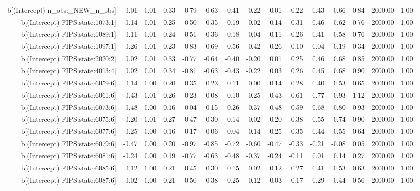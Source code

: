 \begin{table}[ht]
\begin{tabular}{rrrrrrrrrrrrrrr}
  b[(Intercept) n\_obs:\_NEW\_n\_obs] & 0.01 & 0.01 & 0.33 & -0.79 & -0.63 & -0.41 & -0.22 & 0.01 & 0.22 & 0.43 & 0.66 & 0.84 & 2000.00 & 1.00 \\ 
  b[(Intercept) FIPS:state:1073:1] & 0.14 & 0.01 & 0.25 & -0.50 & -0.35 & -0.19 & -0.02 & 0.14 & 0.31 & 0.46 & 0.62 & 0.76 & 2000.00 & 1.00 \\ 
  b[(Intercept) FIPS:state:1089:1] & 0.11 & 0.01 & 0.24 & -0.51 & -0.36 & -0.18 & -0.04 & 0.11 & 0.26 & 0.41 & 0.58 & 0.76 & 2000.00 & 1.00 \\ 
  b[(Intercept) FIPS:state:1097:1] & -0.26 & 0.01 & 0.23 & -0.83 & -0.69 & -0.56 & -0.42 & -0.26 & -0.10 & 0.04 & 0.19 & 0.34 & 2000.00 & 1.00 \\ 
  b[(Intercept) FIPS:state:2020:2] & 0.02 & 0.01 & 0.33 & -0.77 & -0.64 & -0.40 & -0.20 & 0.01 & 0.25 & 0.46 & 0.68 & 0.85 & 2000.00 & 1.00 \\ 
  b[(Intercept) FIPS:state:4013:4] & 0.02 & 0.01 & 0.34 & -0.81 & -0.63 & -0.43 & -0.22 & 0.03 & 0.26 & 0.45 & 0.68 & 0.90 & 2000.00 & 1.00 \\ 
  b[(Intercept) FIPS:state:6059:6] & 0.14 & 0.00 & 0.20 & -0.35 & -0.23 & -0.11 & 0.00 & 0.14 & 0.28 & 0.40 & 0.53 & 0.65 & 2000.00 & 1.00 \\ 
  b[(Intercept) FIPS:state:6061:6] & 0.43 & 0.01 & 0.26 & -0.23 & -0.08 & 0.10 & 0.25 & 0.43 & 0.61 & 0.77 & 0.93 & 1.12 & 2000.00 & 1.00 \\ 
  b[(Intercept) FIPS:state:6073:6] & 0.48 & 0.00 & 0.16 & 0.04 & 0.15 & 0.26 & 0.37 & 0.48 & 0.59 & 0.68 & 0.80 & 0.93 & 2000.00 & 1.00 \\ 
  b[(Intercept) FIPS:state:6075:6] & 0.20 & 0.01 & 0.27 & -0.47 & -0.30 & -0.14 & 0.02 & 0.20 & 0.38 & 0.55 & 0.74 & 0.90 & 2000.00 & 1.00 \\ 
  b[(Intercept) FIPS:state:6077:6] & 0.25 & 0.00 & 0.16 & -0.17 & -0.06 & 0.04 & 0.14 & 0.25 & 0.35 & 0.44 & 0.55 & 0.64 & 2000.00 & 1.00 \\ 
  b[(Intercept) FIPS:state:6079:6] & -0.47 & 0.00 & 0.20 & -0.97 & -0.85 & -0.72 & -0.60 & -0.47 & -0.33 & -0.21 & -0.08 & 0.05 & 2000.00 & 1.00 \\ 
  b[(Intercept) FIPS:state:6081:6] & -0.24 & 0.00 & 0.19 & -0.77 & -0.63 & -0.48 & -0.37 & -0.24 & -0.11 & 0.01 & 0.14 & 0.27 & 2000.00 & 1.00 \\ 
  b[(Intercept) FIPS:state:6085:6] & 0.12 & 0.00 & 0.21 & -0.45 & -0.30 & -0.15 & -0.02 & 0.12 & 0.27 & 0.41 & 0.53 & 0.63 & 2000.00 & 1.00 \\ 
  b[(Intercept) FIPS:state:6087:6] & 0.02 & 0.00 & 0.21 & -0.50 & -0.38 & -0.25 & -0.12 & 0.03 & 0.17 & 0.29 & 0.44 & 0.56 & 2000.00 & 1.00 \\ 

\end{tabular}
\end{table}
